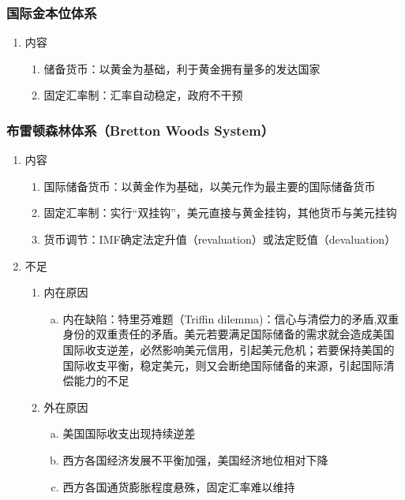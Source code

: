 \documentclass[12pt]{book}
\begin{document}
\subsubsection{国际金本位体系}


\begin{enumerate}[1.]
    \item 内容
          \begin{enumerate}[(1)]
              \item 储备货币：以黄金为基础，利于黄金拥有量多的发达国家
              \item 固定汇率制：汇率自动稳定，政府不干预
          \end{enumerate}
\end{enumerate}



\subsubsection{布雷顿森林体系（Bretton Woods System）}

\begin{enumerate}[1.]
    \item 内容
          \begin{enumerate}[(1)]
              \item 国际储备货币：以黄金作为基础，以美元作为最主要的国际储备货币
              \item 固定汇率制：实行“双挂钩”，美元直接与黄金挂钩，其他货币与美元挂钩
              \item 货币调节：IMF确定法定升值（revaluation）或法定贬值（devaluation）
          \end{enumerate}
    \item 不足
          \begin{enumerate}[(1)]
              \item 内在原因
                    \begin{enumerate}[a.]
                        \item 内在缺陷：特里芬难题（Triffin dilemma)：信心与清偿力的矛盾,双重身份的双重责任的矛盾。美元若要满足国际储备的需求就会造成美国国际收支逆差，必然影响美元信用，引起美元危机；若要保持美国的国际收支平衡，稳定美元，则又会断绝国际储备的来源，引起国际清偿能力的不足
                    \end{enumerate}
              \item 外在原因
                    \begin{enumerate}[a.]
                        \item 美国国际收支出现持续逆差
                        \item 西方各国经济发展不平衡加强，美国经济地位相对下降
                        \item 西方各国通货膨胀程度悬殊，固定汇率难以维持
                    \end{enumerate}
          \end{enumerate}
\end{enumerate}
\end{document}
